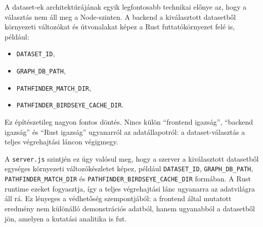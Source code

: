 A dataset-ek architektúrájának egyik legfontosabb technikai előnye az, hogy a választás nem áll meg a Node-szinten. A backend a kiválasztott datasetből környezeti változókat és útvonalakat képez a Rust futtatókörnyezet felé is, például:

\begin{itemize}
    \item \texttt{DATASET\_ID},
    \item \texttt{GRAPH\_DB\_PATH},
    \item \texttt{PATHFINDER\_MATCH\_DIR},
    \item \texttt{PATHFINDER\_BIRDSEYE\_CACHE\_DIR}.
\end{itemize}

Ez építészetileg nagyon fontos döntés. Nincs külön ``frontend igazság'', ``backend igazság'' és ``Rust igazság'' ugyanarról az adatállapotról: a dataset-választás a teljes végrehajtási láncon végigmegy.

A \texttt{server.js} szintjén ez úgy valósul meg, hogy a szerver a kiválasztott datasetből egységes környezeti változókészletet képez, például \texttt{DATASET\_ID}, \texttt{GRAPH\_DB\_PATH}, \texttt{PATHFINDER\_MATCH\_DIR} és \texttt{PATHFINDER\_BIRDSEYE\_CACHE\_DIR} formában. A Rust runtime ezeket fogyasztja, így a teljes végrehajtási lánc ugyanarra az adatvilágra áll rá. Ez lényeges a védhetőség szempontjából: a frontend által mutatott eredmény nem különálló demonstrációs adatból, hanem ugyanabból a datasetből jön, amelyen a kutatási analitika is fut.
